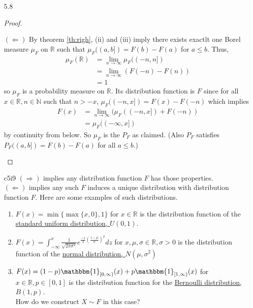 \documentclass{article}
\newcommand{\R}{\mathbb{R}}
\newcommand{\N}{\mathbb{N}}
\begin{document}
\begin{mythm}{}{5.8}
\begin{proof}
\begin{enumerate}[label=(\roman*)]
				$(\Leftarrow)$ By theorem \ref{th:righ}, (ii) and (iii) imply there exists exactlt one Borel measure $\mu_F$ on $\R$ such that $\mu_F((a, b])=F(b)-F(a)$ for $a\leq b$. Thus,
				\begin{align*}
					\mu_F(\R)&=\lim_{n\to\infty}\mu_F((-n, n])\\
					&=\lim_{n\to\infty}(F(-n)-F(n))\\
					&=1
				\end{align*}
				so $\mu_F$ is a probability measure on $\R$. Its distribution function is $F$ since for all $x\in\R, n\in\N$ such that $n>-x$, $\mu_F((-n, x])=F(x)-F(-n)$ which implies
				\begin{align*}
					F(x)&=\lim_{n\to\infty}(\mu_F((-n, x])+F(-n))\\
					&=\mu_F((-\infty, x])
				\end{align*}
				by continuity from below. So $\mu_F$ is the $P_F$ as claimed. (Also $P_F$ satisfies $P_F((a, b])=F(b)-F(a)$ for all $a\leq b$.)
			\end{enumerate}
		\end{proof}
	\end{mythm}
	
	\begin{myrem}{}{c5i9}
		$(\Rightarrow)$ implies any distribution function $F$ has those properties.\\
		
		$(\Leftarrow)$ implies any such $F$ induces a unique distribution with distribution function $F$. Here are some examples of such distributions.
		
		\begin{enumerate}
			\item $F(x)=\min\{\max\{x, 0\}, 1\}$ for $x\in\R$ is the distribution function of the \underline{standard uniform distribution, $U(0, 1)$}.
			
			\item $F(x)=\int_{-\infty}^x\frac{1}{\sqrt{2\pi\sigma^2}}e^{\frac{-1}{2}(\frac{z-\mu}{\sigma})^2}dz$ for $x, \mu, \sigma\in\R, \sigma>0$ is the distribution function of the \underline{normal distribution, $N(\mu, \sigma^2)$}
			
			\item $F(x)=(1-p)\mathbbm{1}_{[0, \infty)}(x)+p\mathbbm{1}_{[1, \infty)}(x)$ for $x\in\R, p\in[0, 1]$ is the distribution function for the \underline{Bernoulli distribution, $B(1, p)$}.\\
			
			How do we construct $X\sim F$ in this case?
		\end{enumerate}
	\end{myrem}
	
\end{document}
